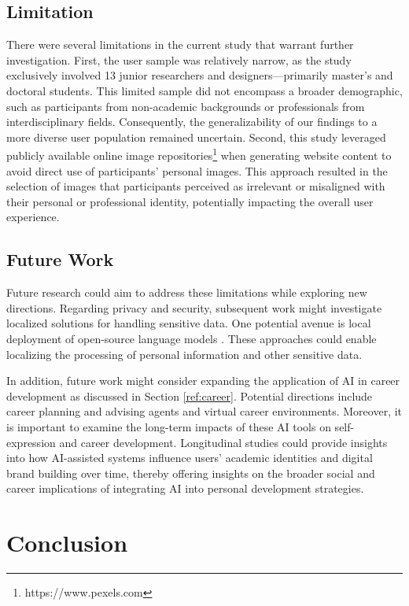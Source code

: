 \subsection{Limitation}

There were several limitations in the current study that warrant further investigation. First, the user sample was relatively narrow, as the study exclusively involved 13 junior researchers and designers—primarily master's and doctoral students. This limited sample did not encompass a broader demographic, such as participants from non-academic backgrounds or professionals from interdisciplinary fields. Consequently, the generalizability of our findings to a more diverse user population remained uncertain. Second, this study leveraged publicly available online image repositories\footnote{https://www.pexels.com} when generating website content to avoid direct use of participants' personal images. This approach resulted in the selection of images that participants perceived as irrelevant or misaligned with their personal or professional identity, potentially impacting the overall user experience.

\subsection{Future Work}

Future research could aim to address these limitations while exploring new directions. Regarding privacy and security, subsequent work might investigate localized solutions for handling sensitive data. One potential avenue is local deployment of open-source language models \cite{guo2025deepseek}. These approaches could enable localizing the processing of personal information and other sensitive data.

In addition, future work might consider expanding the application of AI in career development as discussed in Section \ref{ref:career}. Potential directions include career planning and advising agents and virtual career environments. Moreover, it is important to examine the long-term impacts of these AI tools on self-expression and career development. Longitudinal studies could provide insights into how AI-assisted systems influence users' academic identities and digital brand building over time, thereby offering insights on the broader social and career implications of integrating AI into personal development strategies.

\section{Conclusion}

